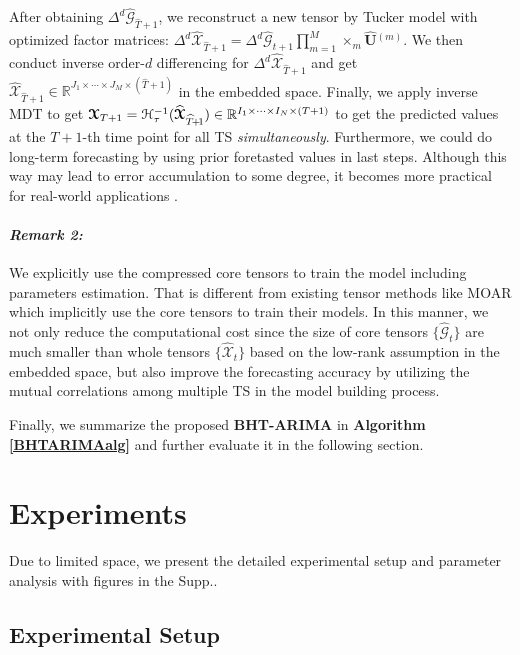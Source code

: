 \documentclass[letterpaper]{article} %
\numberwithin{theorem}{section}
\newcommand{\ten}[1]{ \boldsymbol{\mathcal #1}}
\newcommand{\bbR}[1]{\mathbb{R}^{#1}}
\begin{document}
After obtaining $ \Delta^d  {\widehat{\ten{G}}_{\widehat{T}+1}}$, we reconstruct a new tensor by Tucker model with optimized factor matrices:
$\Delta^d  {\widehat{\ten{X}}_{\widehat{T}+1}} =  \Delta^d  {\widehat{\ten{G}}_{{t}+1}}   \prod_{m=1}^M \times_m  \widehat{ \mathbf U}{^{(m)}} $. We then
conduct inverse order-$d$  differencing  for   $ \Delta^d  {\widehat{\ten{X}}_{\widehat{T}+1}}$ and get   $ {\widehat{\ten{X}}_{\widehat{T}+1}}\in \bbR{J_1 \times \cdots \times J_M \times {(\widehat{T}+1)}} $  in the embedded space. Finally,  we  apply  inverse MDT to get ${{\ten{X}}_{T+1}}  = \mathcal{H}_\tau^{-1}({\widehat{\ten{X}}_{\widehat{T}\hspace{-0.05cm}+\hspace{-0.05cm}1}})   \in \bbR{I_1 \times \cdots \times I_N \times {(T+1)}} $ to get the predicted values at the  $T+1$-th time point for all TS \textit{simultaneously}. Furthermore, we could do long-term forecasting by using prior foretasted values in last steps. Although this way may lead to error accumulation to some degree, it becomes more practical for real-world applications \cite{jing2018high}.

\paragraph{\textit{Remark 2:}}   We  explicitly use the compressed core tensors to train the model including   parameters estimation. That is different from existing tensor methods  like MOAR which implicitly use the core tensors to train their models.  In this manner, we not only reduce the computational cost since the size of core tensors $\{\widehat{\ten{G}}_{t} \} $  are much smaller than whole tensors $\{\widehat{\ten{X}}_{t} \} $ based on the low-rank assumption in the embedded space, but also  improve the forecasting accuracy by  utilizing the mutual correlations  among multiple TS in the model building process.

Finally, we summarize
the proposed \textbf{BHT-ARIMA} in \textbf{Algorithm} \textbf{\ref{BHTARIMAalg}} and further evaluate it in the following section.


\section{Experiments}
Due to limited space,  we  present the detailed experimental setup and  parameter analysis  with   figures  in the  Supp..
\subsection{Experimental Setup}
\end{document}
